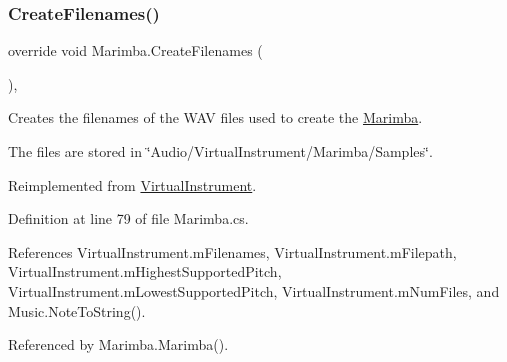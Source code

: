 \subsubsection{\texorpdfstring{Create\+Filenames()}{CreateFilenames()}}
{\footnotesize\ttfamily override void Marimba.\+Create\+Filenames (\begin{DoxyParamCaption}{ }\end{DoxyParamCaption})\hspace{0.3cm}{\ttfamily [protected]}, {\ttfamily [virtual]}}



Creates the filenames of the W\+AV files used to create the \hyperlink{class_marimba}{Marimba}. 

The files are stored in \char`\"{}\+Audio/\+Virtual\+Instrument/\+Marimba/\+Samples\char`\"{}. 

Reimplemented from \hyperlink{group___v_i_base_virt_func_gaacfc9521214176292bfb9665556fb991}{Virtual\+Instrument}.



Definition at line 79 of file Marimba.\+cs.



References Virtual\+Instrument.\+m\+Filenames, Virtual\+Instrument.\+m\+Filepath, Virtual\+Instrument.\+m\+Highest\+Supported\+Pitch, Virtual\+Instrument.\+m\+Lowest\+Supported\+Pitch, Virtual\+Instrument.\+m\+Num\+Files, and Music.\+Note\+To\+String().



Referenced by Marimba.\+Marimba().


